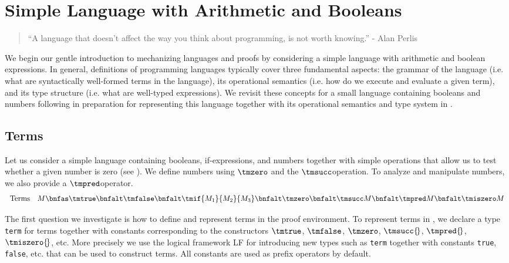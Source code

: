 

\chapter{Simple Language with Arithmetic and Booleans}
\label{chap:basic}
\begin{quote}
``A language that doesn't affect the way you think about programming, is
not worth knowing.''
\hfill - Alan Perlis
\end{quote}

We begin our gentle introduction to mechanizing languages and proofs by
considering a simple language with arithmetic and boolean
expressions. In general, definitions of programming languages
typically cover three fundamental aspects:
the grammar  of the language  (i.e. what are syntactically well-formed terms in
the language),  its operational semantics (i.e. how do we execute and evaluate a
given term),  and its  type structure (i.e. what are  well-typed expressions).  We
revisit  these concepts  for  a small language  containing booleans  and numbers
following \citep[Ch 3,Ch 8]{TAPL} in  preparation for representing this language
together with its operational semantics and type system in \beluga.

\section{Terms}\label{sec:terms-basic}
Let  us  consider  a simple language  containing booleans,  if-expressions,  and
numbers together  with simple operations  that allow us  to test whether a given
number is zero (see \cite[Ch 3, Fig 3-1,Fig 3-2]{TAPL}). We define numbers using
$\tmzero$ and the $\tmsucc$operation.  To analyze  and manipulate numbers,  we also
provide a $\tmpred$operator.
\[
\begin{array}{ll@{\bnfas}l}
\mbox{Terms} & M & \tmtrue \bnfalt \tmfalse \bnfalt \tmif{M_1}{M_2}{M_3} \bnfalt
\tmzero \bnfalt \tmsucc M \bnfalt \tmpred M \bnfalt \tmiszero M
\end{array}
\]

The first question  we investigate is  how to define  and represent terms in the
\beluga proof  environment. To represent  terms  in \beluga,  we declare  a type
\lstinline!term!  for  terms   together  with  constants  corresponding  to  the
constructors    $\tmtrue$,   $\tmfalse$,    $\tmzero$,   $\tmsucc{\!}$,   $\tmpred{\!}$,
$\tmiszero{\!}$,  etc.   More   precisely   we   use   the   logical   framework  LF
\citep{Harper93jacm} for introducing new types such as \lstinline!term! together
with constants  \lstinline!true!,  \lstinline!false!, etc.  that  can be used to
construct terms. All constants are used as prefix operators by default.

